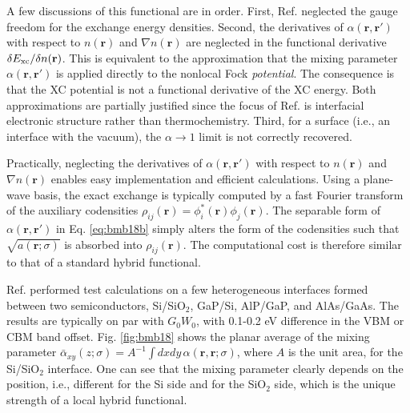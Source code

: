 \documentclass[aip, amsmath, amssymb, reprint, longbibliography]{revtex4-2}
\def\mr{\mathbf{r}}
\begin{document}
A few discussions of this functional are in order. First, Ref.  neglected the gauge freedom \cite{BCL98} for the exchange energy densities. Second, the derivatives of $\alpha(\mr,\mr')$ with respect to $n(\mr)$ and $\nabla n(\mr)$ are neglected in the functional derivative $\delta E_{\rm xc}/\delta n(\mr)$. This is equivalent to the approximation that the mixing parameter $\alpha(\mr,\mr')$ is applied directly to the nonlocal Fock \emph{potential}. The consequence is that the XC potential is not a functional derivative of the XC energy. Both approximations are partially justified since the focus of Ref.  is interfacial electronic structure rather than thermochemistry. Third, for a surface (i.e., an interface with the vacuum), the $\alpha \to 1$ limit is not correctly recovered.

Practically, neglecting the derivatives of $\alpha(\mr,\mr')$ with respect to $n(\mr)$ and $\nabla n(\mr)$ enables easy implementation and efficient calculations. Using a plane-wave basis, the exact exchange is typically computed \cite{SFH06} by a fast Fourier transform of the auxiliary codensities $\rho_{ij}(\mr)=\phi_i^*(\mr)\phi_j(\mr)$. The separable form of $\alpha(\mr,\mr')$ in Eq. \eqref{eq:bmb18b} simply alters the form of the codensities such that $\sqrt{a(\mr;\sigma)}$ is absorbed into $\rho_{ij}(\mr)$. The computational cost is therefore similar to that of a standard hybrid functional.

Ref.  performed test calculations on a few heterogeneous interfaces formed between two semiconductors, Si/SiO$_2$, GaP/Si, AlP/GaP, and AlAs/GaAs. The results are typically on par with $G_0W_0$, with 0.1-0.2 eV difference in the VBM or CBM band offset. Fig. \ref{fig:bmb18} shows the planar average of the mixing parameter $\bar{\alpha}_{xy}(z;\sigma)=A^{-1}\int dxdy \, \alpha(\mr,\mr;\sigma)$, where $A$ is the unit area, for the Si/SiO$_2$ interface. One can see that the mixing parameter clearly depends on the position, i.e., different for the Si side and for the SiO$_2$ side, which is the unique strength of a local hybrid functional.
\end{document}
